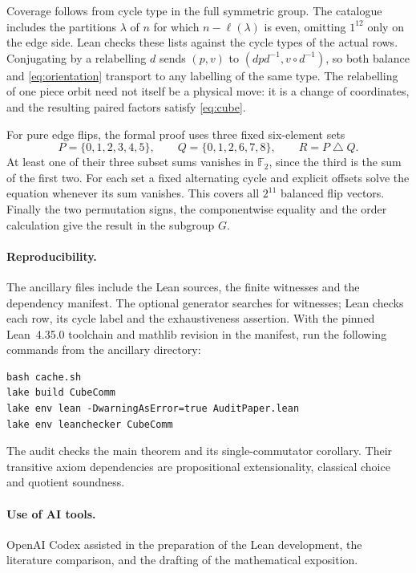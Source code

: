 \documentclass[11pt,letterpaper]{article}
\theoremstyle{definition}
\theoremstyle{remark}
\newcommand{\F}{\mathbb F}
\begin{document}
Coverage follows from cycle type in the full symmetric group. The
catalogue includes the partitions \(\lambda\) of \(n\) for which
\(n-\ell(\lambda)\) is even, omitting \(1^{12}\) only on the edge side.
Lean checks these lists against the cycle types of the actual rows.
Conjugating by a relabelling \(d\) sends \((p,v)\) to
\((dpd^{-1},v\circ d^{-1})\), so both balance and \eqref{eq:orientation}
transport to any labelling of the same type. The relabelling of one
piece orbit need not itself be a physical move: it is a change of
coordinates, and the resulting paired factors satisfy \eqref{eq:cube}.

For pure edge flips, the formal proof uses three fixed six-element sets
\[
 P=\{0,1,2,3,4,5\},\qquad Q=\{0,1,2,6,7,8\},\qquad R=P\mathbin{\triangle}Q.
\]
At least one of their three subset sums vanishes in \(\F_2\), since the
third is the sum of the first two. For each set a fixed alternating
cycle and explicit offsets solve the equation whenever its sum vanishes.
This covers all \(2^{11}\) balanced flip vectors. Finally the two
permutation signs, the componentwise equality and the order calculation
give the result in the subgroup \(G\).

\paragraph{Reproducibility.}
The ancillary files include the Lean sources, the finite witnesses and
the dependency manifest. The optional generator searches for witnesses;
Lean checks each row, its cycle label and the exhaustiveness assertion.
With the pinned Lean~4.35.0 toolchain and mathlib revision in the
manifest, run the following commands from the ancillary directory:
\begin{verbatim}
bash cache.sh
lake build CubeComm
lake env lean -DwarningAsError=true AuditPaper.lean
lake env leanchecker CubeComm
\end{verbatim}
The audit checks the main theorem and its single-commutator corollary.
Their transitive axiom dependencies are propositional extensionality,
classical choice and quotient soundness.

\paragraph{Use of AI tools.}
OpenAI Codex assisted in the preparation of the Lean development,
the literature comparison, and the drafting of the mathematical exposition.
\end{document}
